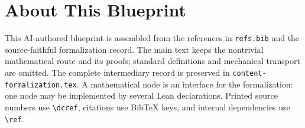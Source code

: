 

\chapter*{About This Blueprint}

This AI-authored blueprint is assembled from the references in \texttt{refs.bib}
and the source-faithful formalization record.  The main text keeps the
nontrivial mathematical route and its proofs; standard definitions and
mechanical transport are omitted.  The complete intermediary record is
preserved in \texttt{content-formalization.tex}.  A mathematical node is an
interface for the formalization: one node may be implemented by several Lean
declarations.  Printed source numbers use \texttt{\textbackslash dcref},
citations use BibTeX keys, and internal dependencies use
\texttt{\textbackslash ref}.









\appendix

